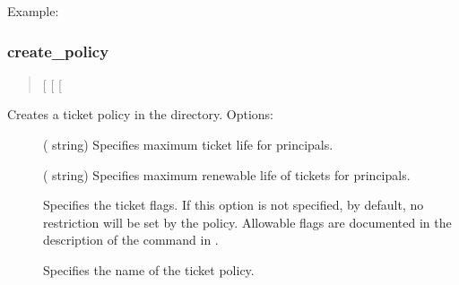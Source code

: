 \documentclass[letterpaper,10pt,english]{sphinxmanual}
\begin{document}
Example:

%
\begin{sphinxVerbatim}[commandchars=\\\{\}]
   
  
   
\end{sphinxVerbatim}


\subsubsection{create\_policy}
\label{\detokenize{admin/admin_commands/kdb5_ldap_util:create-policy}}\label{\detokenize{admin/admin_commands/kdb5_ldap_util:kdb5-ldap-util-stashsrvpw-end}}\label{\detokenize{admin/admin_commands/kdb5_ldap_util:kdb5-ldap-util-create-policy}}\begin{quote}

{[} \sphinxstyleemphasis{max\_ticket\_life}{]}
{[} \sphinxstyleemphasis{max\_renewable\_ticket\_life}{]}
{[}\sphinxstyleemphasis{ticket\_flags}{]}
\end{quote}

Creates a ticket policy in the directory.  Options:
\begin{description}
\item[{ }] \leavevmode
( string) Specifies maximum ticket life for
principals.

\item[{ }] \leavevmode
( string) Specifies maximum renewable life of
tickets for principals.

\item[{}] \leavevmode
Specifies the ticket flags.  If this option is not specified, by
default, no restriction will be set by the policy.  Allowable
flags are documented in the description of the 
command in {\hyperref[\detokenize{admin/admin_commands/kadmin_local:kadmin-1}]{}}.

\item[{}] \leavevmode
Specifies the name of the ticket policy.

\end{description}
\end{document}

